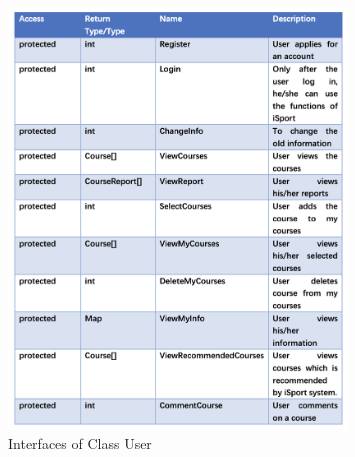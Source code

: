 \documentclass[16pt]{scrreprt}
\begin{document}
\begin{figure}[H]
    \centering
    \includegraphics[width=0.8\textwidth]{figures/interface.png}
    \caption{Interfaces of Class User}
\end{figure}

%
\end{document}
